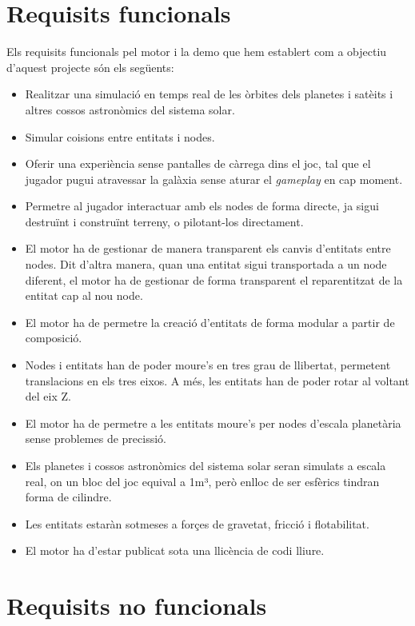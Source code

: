 \section{Requisits funcionals}
Els requisits funcionals pel motor i la demo que hem establert com a objectiu d'aquest projecte són els següents:
\begin{itemize}
  \item Realitzar una simulació en temps real de les òrbites dels planetes i satè\lgem its i altres cossos astronòmics del sistema solar. 
  \item Simular co\lgem isions entre entitats i nodes.
  \item Oferir una experiència sense pantalles de càrrega dins el joc, tal que el jugador pugui atravessar la galàxia sense aturar el \textit{gameplay} en cap moment.
  \item Permetre al jugador interactuar amb els nodes de forma directe, ja sigui destruïnt i construïnt terreny, o pilotant-los directament.
  \item El motor ha de gestionar de manera transparent els canvis d'entitats entre nodes. Dit d'altra manera, quan una entitat sigui transportada a un node diferent, el motor ha de gestionar de forma transparent el reparentitzat de la entitat cap al nou node.
  \item El motor ha de permetre la creació d'entitats de forma modular a partir de composició.
  \item Nodes i entitats han de poder moure's en tres grau de llibertat, permetent translacions en els tres eixos. A més, les entitats han de poder rotar al voltant del eix Z.
  \item El motor ha de permetre a les entitats moure's per nodes d'escala planetària sense problemes de precissió.
  \item Els planetes i cossos astronòmics del sistema solar seran simulats a escala real, on un bloc del joc equival a 1m³, però enlloc de ser esfèrics tindran forma de cilindre.
  \item Les entitats estaràn sotmeses a forçes de gravetat, fricció i flotabilitat.
  \item El motor ha d'estar publicat sota una llicència de codi lliure.
\end{itemize}
\section{Requisits no funcionals}
